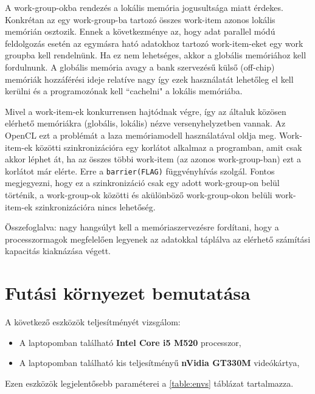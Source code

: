 	A work-group-okba rendezés a lokális memória jogusultsága miatt érdekes.
	Konkrétan az egy work-group-ba tartozó összes work-item azonos lokális memórián
	osztozik.
	Ennek a következménye az, hogy adat parallel módú feldolgozás esetén
	az egymásra ható adatokhoz tartozó work-item-eket egy work groupba kell
	rendelnünk.
	Ha ez nem lehetséges, akkor a globális memóriához kell fordulnunk.
	A globális memória avagy a bank szervezésű külső (off-chip) memóriák
	hozzáférési ideje relatíve nagy így ezek használatát lehetőleg el kell kerülni
	és a programozónak kell ``cachelni" a lokális memóriába.
	
	Mivel a work-item-ek konkurrensen hajtódnak végre, így az általuk közösen elérhető memóriákra
	(globális, lokális) nézve versenyhelyzetben vannak.
	Az OpenCL ezt a problémát a laza memóriamodell használatával oldja meg.
	Work-item-ek közötti szinkronizációra egy korlátot alkalmaz a programban, amit csak akkor léphet át, ha az összes többi
	work-item (az azonos work-group-ban) ezt a korlátot már elérte.
	Erre a \texttt{barrier(FLAG)} függvényhívás szolgál. Fontos megjegyezni, hogy ez a szinkronizáció csak egy adott
	work-group-on belül történik, a work-group-ok közötti és akülönböző work-group-okon belüli work-item-ek szinkronizációra nincs
	lehetőség.
	
	\begin{center}
		Összefoglalva: nagy hangsúlyt kell a memóriaszervezésre fordítani, hogy a processzormagok megfelelően legyenek az adatokkal
		táplálva az elérhető számítási kapacitás kiaknázása végett.
	\end{center}


\section{Futási környezet bemutatása}
	A következő eszközök teljesítményét vizsgálom:
	\begin{itemize}
		\item A laptopomban található \textbf{Intel Core i5 M520} processzor,
		\item A laptopomban található kis teljesítményű \textbf{nVidia GT330M} videókártya,
	\end{itemize}
	Ezen eszközök legjelentősebb paraméterei a \ref{table:envs} táblázat tartalmazza.
	
